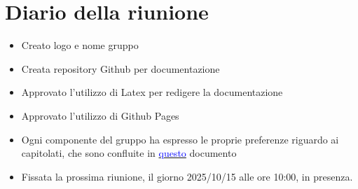 \section{Diario della riunione}

\begin{itemize}
    \item Creato logo e nome gruppo
    \item Creata repository Github per documentazione
    \item Approvato l'utilizzo di Latex per redigere la documentazione
    \item Approvato l'utilizzo di Github Pages
    \item Ogni componente del gruppo ha espresso le proprie preferenze riguardo ai capitolati, che sono confluite in \href{https://docs.google.com/spreadsheets/d/1QaMKRtNCo9-x2O6sPm80BQgh0mwIuRUwIfmQZ6hzgeY/edit?gid=0#gid=0}{\textcolor{blue}{questo}} documento
    \item Fissata la prossima riunione, il giorno 2025/10/15 alle ore 10:00, in presenza.
\end{itemize}